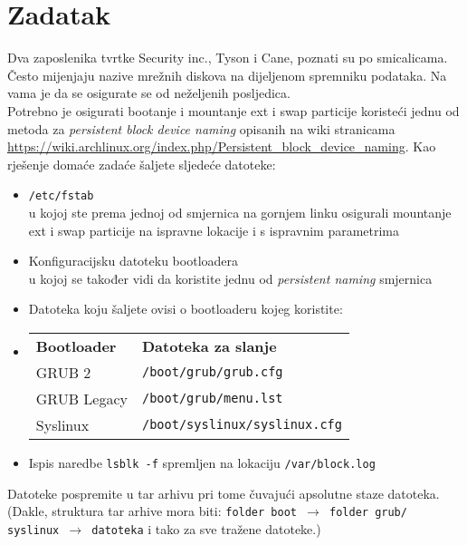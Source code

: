 \documentclass[12pt,a4paper]{article}
\begin{document}
    \section{Zadatak}
    Dva zaposlenika tvrtke Security inc., Tyson i Cane, poznati su po smicalicama. Često mijenjaju nazive mrežnih diskova na dijeljenom spremniku podataka. Na vama je da se osigurate se od neželjenih posljedica. \\ 
    Potrebno je osigurati bootanje i mountanje ext i swap particije koristeći jednu od metoda za \emph{persistent block device naming} opisanih na wiki stranicama      
    \url{https://wiki.archlinux.org/index.php/Persistent_block_device_naming}. Kao rješenje domaće zadaće šaljete sljedeće datoteke:
    \begin{itemize}
        \item \texttt{/etc/fstab}\\
            u kojoj ste prema jednoj od smjernica na gornjem linku osigurali mountanje ext i swap particije na ispravne lokacije i s ispravnim parametrima
        \item Konfiguracijsku datoteku bootloadera\\
            u kojoj se također vidi da koristite jednu od \emph{persistent naming} smjernica
        \item[] Datoteka koju šaljete ovisi o bootloaderu kojeg koristite:
        \item[] \begin{tabular}{p{4cm} p{5cm}}
                    \textbf{Bootloader} & \textbf{Datoteka za slanje} \\
                    GRUB 2 & \texttt{/boot/grub/grub.cfg}\\
                    GRUB Legacy & \texttt{/boot/grub/menu.lst}\\
                    Syslinux & \texttt{/boot/syslinux/syslinux.cfg}
                \end{tabular}
        \item Ispis naredbe \texttt{lsblk -f} spremljen na lokaciju \texttt{/var/block.log}
    \end{itemize}
    Datoteke pospremite u tar arhivu pri tome čuvajući apsolutne staze datoteka. (Dakle, struktura tar arhive mora biti: \texttt{folder boot $\rightarrow$ folder grub/ syslinux $\rightarrow$ datoteka} i tako za sve tražene datoteke.)\\
    
   
\end{document}
